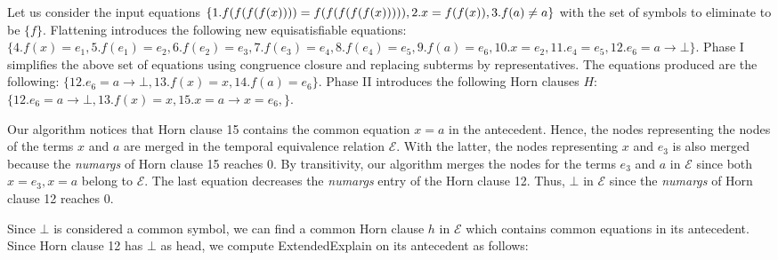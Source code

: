 \begin{example}
  Let us consider the input equations $\{ \\
    1. f(f(f(f(x)))) = f(f(f(f(f(x))))), 2. x = f(f(x)), 
    3. f(a) \neq a
  \}$ 
  with the 
  set of symbols to eliminate to be 
  $\{ f \}$.
  Flattening introduces the following
  new equisatisfiable equations:
  $\{
    4. f(x) = e_1, 5. f(e_1) = e_2, 
    6. f(e_2) = e_3, 7. f(e_3) = e_4,
    8. f(e_4) = e_5, 9. f(a) = e_6,
    10. x = e_2, 11. e_4 = e_5, 
    12. e_6 = a \rightarrow \bot 
  \}$. 
  Phase I simplifies the above set of equations
  using congruence closure and replacing subterms
  by representatives. The equations produced are 
  the following:
  $\{
    12. e_6 = a \rightarrow \bot, 13. f(x) = x, 
    14. f(a) = e_6
  \}$.
  Phase II introduces the following 
  Horn clauses $H$:
  $\{
    12. e_6 = a \rightarrow \bot, 13. f(x) = x, 
    15. x = a \rightarrow x = e_6,
  \}$.

  Our algorithm notices that Horn clause 15
  contains the common equation $x = a$ in the
  antecedent. Hence, the nodes representing 
  the nodes of the terms $x$ and $a$ are merged in
  the temporal equivalence relation $\mathcal{E}$.
  With the latter, the nodes representing $x$ and 
  $e_3$ is also merged because
  the \emph{numargs} of Horn clause 15 reaches
  0. By transitivity, our algorithm
  merges the nodes for the terms $e_3$ and 
  $a$ in $\mathcal{E}$ 
  since both $x = e_3,
  x = a$ belong to $\mathcal{E}$.
  The last equation decreases the 
  \emph{numargs} entry of the Horn clause
  12. Thus, $\bot$ in $\mathcal{E}$ since
  the \emph{numargs} of Horn clause 12 reaches 0.

  Since $\bot$ is considered a common symbol,
  we can find a common Horn clause $h$ 
  in $\mathcal{E}$ which contains common equations
  in its antecedent. Since Horn clause 12 has
  $\bot$ as head, we compute ExtendedExplain
  on its antecedent as follows:
  


\end{example}
